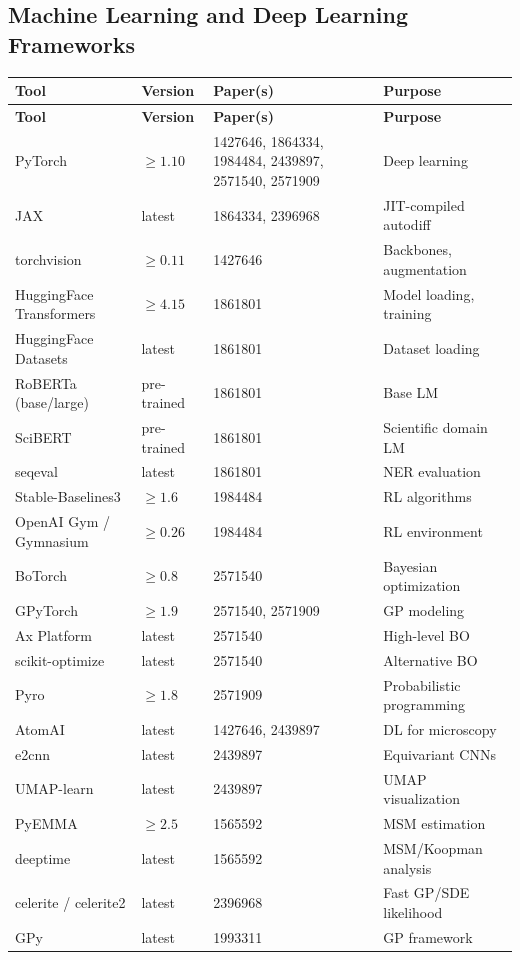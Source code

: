\documentclass[11pt,a4paper]{article}
\begin{document}
\subsection{Machine Learning and Deep Learning Frameworks}

\begin{longtable}{p{4cm} p{2cm} p{3cm} p{4.5cm}}
\toprule
\textbf{Tool} & \textbf{Version} & \textbf{Paper(s)} & \textbf{Purpose} \\
\midrule
\endfirsthead
\toprule
\textbf{Tool} & \textbf{Version} & \textbf{Paper(s)} & \textbf{Purpose} \\
\midrule
\endhead
PyTorch & $\geq 1.10$ & 1427646, 1864334, 1984484, 2439897, 2571540, 2571909 & Deep learning \\
\midrule
JAX & latest & 1864334, 2396968 & JIT-compiled autodiff \\
\midrule
torchvision & $\geq 0.11$ & 1427646 & Backbones, augmentation \\
\midrule
HuggingFace Transformers & $\geq 4.15$ & 1861801 & Model loading, training \\
\midrule
HuggingFace Datasets & latest & 1861801 & Dataset loading \\
\midrule
RoBERTa (base/large) & pre-trained & 1861801 & Base LM \\
\midrule
SciBERT & pre-trained & 1861801 & Scientific domain LM \\
\midrule
seqeval & latest & 1861801 & NER evaluation \\
\midrule
Stable-Baselines3 & $\geq 1.6$ & 1984484 & RL algorithms \\
\midrule
OpenAI Gym / Gymnasium & $\geq 0.26$ & 1984484 & RL environment \\
\midrule
BoTorch & $\geq 0.8$ & 2571540 & Bayesian optimization \\
\midrule
GPyTorch & $\geq 1.9$ & 2571540, 2571909 & GP modeling \\
\midrule
Ax Platform & latest & 2571540 & High-level BO \\
\midrule
scikit-optimize & latest & 2571540 & Alternative BO \\
\midrule
Pyro & $\geq 1.8$ & 2571909 & Probabilistic programming \\
\midrule
AtomAI & latest & 1427646, 2439897 & DL for microscopy \\
\midrule
e2cnn & latest & 2439897 & Equivariant CNNs \\
\midrule
UMAP-learn & latest & 2439897 & UMAP visualization \\
\midrule
PyEMMA & $\geq 2.5$ & 1565592 & MSM estimation \\
\midrule
deeptime & latest & 1565592 & MSM/Koopman analysis \\
\midrule
celerite / celerite2 & latest & 2396968 & Fast GP/SDE likelihood \\
\midrule
GPy & latest & 1993311 & GP framework \\
\bottomrule
\end{longtable}
\end{document}
